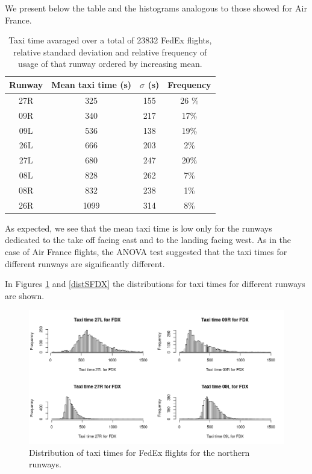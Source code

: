 \documentclass{article}
\begin{document}
We present below the table and the histograms analogous to those showed for Air France.



\begin{table}[h!!!!!!!!!!!!!!!!!]	
	\centering
	\begin{tabular}{c|c|c|c}
		\centering
		\textbf{Runway} & \textbf{Mean taxi time (s)} & \textbf{$\sigma$ (s)} &  \textbf{Frequency}\\
		\hline
		27R & 325 & 155 & 26 \% \\
		\hline
		09R & 340 & 217 & 17\%\\
		\hline
		09L & 536 & 138 & 19\%\\
		\hline
		26L & 666 & 203 & 2\%\\
		\hline
		27L & 680 & 247& 20\%\\
		\hline
		08L & 828 & 262 & 7\%\\
		\hline
		08R & 832 & 238 & 1\%\\
		\hline
		26R & 1099 & 314 & 8\%\\	
	\end{tabular}
	\caption{Taxi time avaraged over a total of 23832 FedEx flights, relative standard deviation and relative frequency of usage of that runway ordered by increasing mean.}
	\label{tableRunwayFDX}
\end{table}

As expected, we see that the mean taxi time is low only for the runways dedicated to the take off facing east and to the landing facing west.
As in the case of Air France flights, the ANOVA test suggested that the taxi times for different runways are significantly different.

In Figures \ref{distNFDX} and \ref{distSFDX} the distributions for taxi times for different runways are shown.

\begin{figure}[h!!!!!!!!]
	\centering
	\includegraphics[width=\textwidth]{FDX_pistes_nord}
	\caption{Distribution of taxi times for FedEx flights for the northern runways.}
	\label{distNFDX}
\end{figure}
\end{document}
